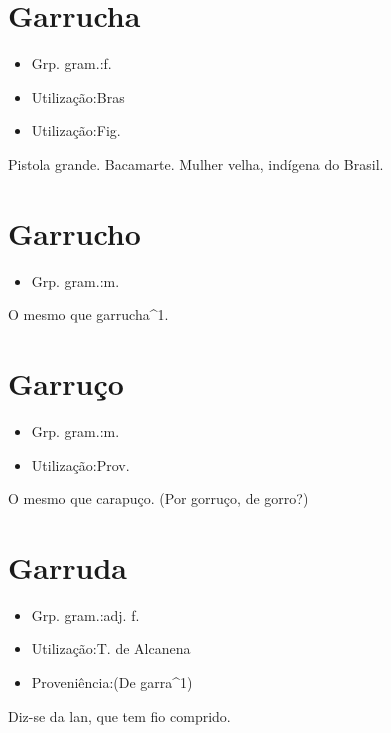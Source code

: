 \section{Garrucha}
\begin{itemize}
\item {Grp. gram.:f.}
\end{itemize}
\begin{itemize}
\item {Utilização:Bras}
\end{itemize}
\begin{itemize}
\item {Utilização:Fig.}
\end{itemize}
Pistola grande.
Bacamarte.
Mulher velha, indígena do Brasil.
\section{Garrucho}
\begin{itemize}
\item {Grp. gram.:m.}
\end{itemize}
O mesmo que \textunderscore garrucha\textunderscore ^1.
\section{Garruço}
\begin{itemize}
\item {Grp. gram.:m.}
\end{itemize}
\begin{itemize}
\item {Utilização:Prov.}
\end{itemize}
O mesmo que \textunderscore carapuço\textunderscore .
(Por \textunderscore gorruço\textunderscore , de \textunderscore gorro\textunderscore ?)
\section{Garruda}
\begin{itemize}
\item {Grp. gram.:adj. f.}
\end{itemize}
\begin{itemize}
\item {Utilização:T. de Alcanena}
\end{itemize}
\begin{itemize}
\item {Proveniência:(De \textunderscore garra\textunderscore ^1)}
\end{itemize}
Diz-se da lan, que tem fio comprido.
